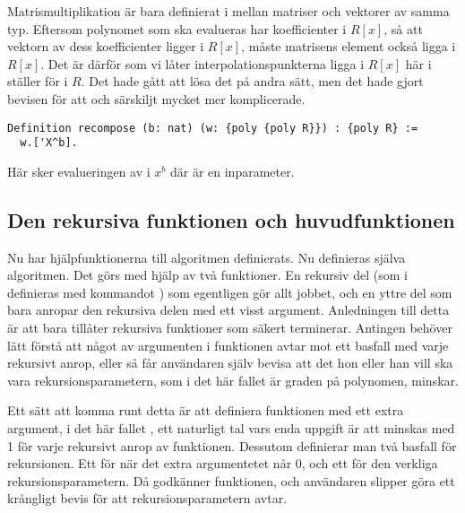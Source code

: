 Matrismultiplikation är bara definierat i \ssr mellan matriser och vektorer av
samma typ. Eftersom polynomet  som ska evalueras har koefficienter i
$R[x]$, så att vektorn av dess koefficienter ligger i $R[x]$, måste matrisens
element också ligga i $R[x]$. Det är därför som vi låter
interpolationspunkterna ligga i $R[x]$ här i ställer för i $R$. Det hade gått
att lösa det på andra sätt, men det hade gjort bevisen för att  och
särskiljt  mycket mer komplicerade.

\begin{lstlisting}
Definition recompose (b: nat) (w: {poly {poly R}}) : {poly R} :=
  w.['X^b].
\end{lstlisting}
Här sker evalueringen av  i $x^b$ där  är en inparameter.

\subsection{Den rekursiva funktionen och huvudfunktionen}

Nu har hjälpfunktionerna till algoritmen definierats. Nu definieras själva
algoritmen. Det görs med hjälp av två funktioner. En rekursiv del (som i \coq{}
definieras med kommandot ) som egentligen gör allt jobbet, och en
yttre del som bara anropar den rekursiva delen med ett visst argument.
Anledningen till detta är att \coq{} bara tillåter rekursiva funktioner som
säkert terminerar. Antingen behöver \coq{} lätt förstå att något av argumenten
i funktionen avtar mot ett basfall med varje rekursivt anrop, eller så får
användaren själv bevisa att det hon eller han vill ska vara
rekursionsparametern, som i det här fallet är graden på polynomen, minskar.

Ett sätt att komma runt detta är att definiera funktionen med ett extra
argument, i det här fallet , ett naturligt tal vars enda uppgift är att
minskas med 1 för varje rekursivt anrop av funktionen. Dessutom definierar man
två basfall för rekursionen. Ett för när det extra argumentetet  når 0,
och ett för den verkliga rekursionsparametern. Då godkänner \coq{} funktionen,
och användaren slipper göra ett krångligt bevis för att rekursionsparametern
avtar.


